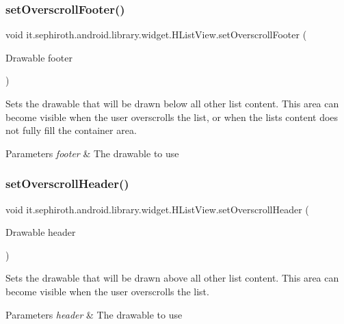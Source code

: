 \subsubsection{\texorpdfstring{set\+Overscroll\+Footer()}{setOverscrollFooter()}}
{\footnotesize\ttfamily void it.\+sephiroth.\+android.\+library.\+widget.\+H\+List\+View.\+set\+Overscroll\+Footer (\begin{DoxyParamCaption}\item[{Drawable}]{footer }\end{DoxyParamCaption})}

Sets the drawable that will be drawn below all other list content. This area can become visible when the user overscrolls the list, or when the list\textquotesingle{}s content does not fully fill the container area.


\begin{DoxyParams}{Parameters}
{\em footer} & The drawable to use \\
\hline
\end{DoxyParams}
\mbox{\label{classit_1_1sephiroth_1_1android_1_1library_1_1widget_1_1_h_list_view_af637ad0095b9413b784aaf8a3e32ba07}} 
\subsubsection{\texorpdfstring{set\+Overscroll\+Header()}{setOverscrollHeader()}}
{\footnotesize\ttfamily void it.\+sephiroth.\+android.\+library.\+widget.\+H\+List\+View.\+set\+Overscroll\+Header (\begin{DoxyParamCaption}\item[{Drawable}]{header }\end{DoxyParamCaption})}

Sets the drawable that will be drawn above all other list content. This area can become visible when the user overscrolls the list.


\begin{DoxyParams}{Parameters}
{\em header} & The drawable to use \\
\hline
\end{DoxyParams}
\mbox{\label{classit_1_1sephiroth_1_1android_1_1library_1_1widget_1_1_h_list_view_a25c39c0ebc52b9e19b30328fb3c7a217}} 

